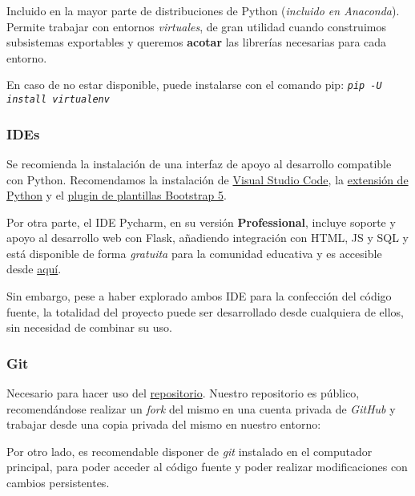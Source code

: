 Incluido en la mayor parte de distribuciones de Python (\textit{incluido en Anaconda}). Permite trabajar con entornos \textit{virtuales}, de gran utilidad cuando construimos subsistemas exportables y queremos \textbf{acotar} las librerías necesarias para cada entorno.

En caso de no estar disponible, puede instalarse con el comando pip:
\texttt{\textit{pip -U install virtualenv}}

\subsubsection{IDEs}

Se recomienda la instalación de una interfaz de apoyo al desarrollo compatible con Python.
Recomendamos la instalación de \href{https://code.visualstudio.com/download}{Visual Studio Code}, la \href{https://marketplace.visualstudio.com/items?itemName=ms-python.python}{extensión de Python} y el \href{https://marketplace.visualstudio.com/items?itemName=HansUXdev.bootstrap5-snippets}{plugin de plantillas Bootstrap 5}.

Por otra parte, el IDE Pycharm, en su versión \textbf{Professional}, incluye soporte y apoyo al desarrollo web con Flask, añadiendo integración con HTML, JS y SQL y está disponible de forma \textit{gratuita} para la comunidad educativa y es accesible desde \href{https://www.jetbrains.com/es-es/pycharm/download/#section=windows}{aquí}.

Sin embargo, pese a haber explorado ambos IDE para la confección del código fuente, la totalidad del proyecto puede ser desarrollado desde cualquiera de ellos, sin necesidad de combinar su uso.

\subsubsection{Git}

Necesario para hacer uso del \href{https://github.com/jesgararm/GestorQuirofanos}{repositorio}. Nuestro repositorio es público, recomendándose realizar un \textit{fork} del mismo en una cuenta privada de \textit{GitHub} y trabajar desde una copia privada del mismo en nuestro entorno:


Por otro lado, es recomendable disponer de \textit{git} instalado en el computador principal, para poder acceder al código fuente y poder realizar modificaciones con cambios persistentes.

